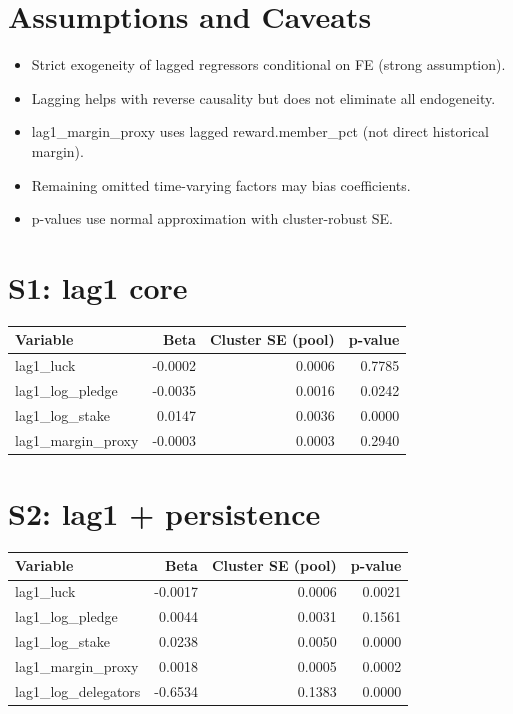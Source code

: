 \documentclass[11pt]{article}
\begin{document}
\section*{Assumptions and Caveats}
\begin{itemize}
\item Strict exogeneity of lagged regressors conditional on FE (strong assumption).
\item Lagging helps with reverse causality but does not eliminate all endogeneity.
\item lag1\_margin\_proxy uses lagged reward.member\_pct (not direct historical margin).
\item Remaining omitted time-varying factors may bias coefficients.
\item p-values use normal approximation with cluster-robust SE.
\end{itemize}

\section*{S1: lag1 core}
\begin{table}[h]
\centering
\small
\begin{tabular}{lrrr}
\toprule
Variable & Beta & Cluster SE (pool) & p-value \\
\midrule
lag1\_luck & -0.0002 & 0.0006 & 0.7785 \\
lag1\_log\_pledge & -0.0035 & 0.0016 & 0.0242 \\
lag1\_log\_stake & 0.0147 & 0.0036 & 0.0000 \\
lag1\_margin\_proxy & -0.0003 & 0.0003 & 0.2940 \\
\bottomrule
\end{tabular}
\end{table}

\section*{S2: lag1 + persistence}
\begin{table}[h]
\centering
\small
\begin{tabular}{lrrr}
\toprule
Variable & Beta & Cluster SE (pool) & p-value \\
\midrule
lag1\_luck & -0.0017 & 0.0006 & 0.0021 \\
lag1\_log\_pledge & 0.0044 & 0.0031 & 0.1561 \\
lag1\_log\_stake & 0.0238 & 0.0050 & 0.0000 \\
lag1\_margin\_proxy & 0.0018 & 0.0005 & 0.0002 \\
lag1\_log\_delegators & -0.6534 & 0.1383 & 0.0000 \\
\bottomrule
\end{tabular}
\end{table}
\end{document}
